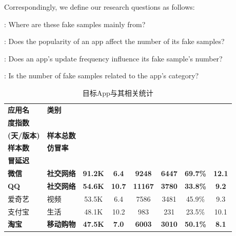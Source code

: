 Correspondingly, we define our research questions as follows:

: Where are these fake samples mainly from?

: Does the popularity of an app affect the number of its fake samples?

: Does an app's update frequency influence its fake sample's number?

: Is the number of fake samples related to the app's category?

\begin{ThreePartTable}
\centering
\renewcommand{\arraystretch}{1.05}
\footnotesize
\setlength{\belowcaptionskip}{-5pt}
\vspace{1mm}
\begin{longtable}{l l c c c c c c}
\caption{目标App与其相关统计}\label{table:data-statistics}\\
\toprule
{\bf 应用名} & {\bf 类别} & \begin{tabular}[c]{@{}c@{}}{\bf 月度热} \\ {\bf 度指数} \end{tabular} & \begin{tabular}[c]{@{}c@{}}{\bf 更新频率} \\ {\bf (天/版本)} \end{tabular} & {\bf 样本总数} & \begin{tabular}[c]{@{}c@{}}{\bf 仿冒} \\ {\bf 样本数} \end{tabular} & {\bf 仿冒率} & \begin{tabular}[c]{@{}c@{}}{\bf 平均仿} \\ {\bf 冒延迟} \end{tabular} \\
\midrule
{\bf 微信}\tnote{*} & {\bf 社交网络} & {\bf 91.2K} & {\bf 6.4} & {\bf 9248} & {\bf 6447} & {\bf 69.7\%} & {\bf 12.1} \\
\rowcolor{gray!15} {\bf QQ}\tnote{*} & {\bf 社交网络} & {\bf 54.6K} & {\bf 10.7} & {\bf 11167} & {\bf 3780} & {\bf 33.8\%} & {\bf 9.2} \\
爱奇艺 & 视频 & 53.5K & 6.4 & 7586 & 3481 & 45.9\% & 9.3 \\
\rowcolor{gray!15} 支付宝 & 生活 & 48.1K & 10.2 & 983 & 231 & 23.5\% & 10.1 \\
{\bf 淘宝}\tnote{*} & {\bf 移动购物} & {\bf 47.5K} & {\bf 7.0} & {\bf 6003} & {\bf 3010} & {\bf 50.1\%} & {\bf 8.1} \\

\end{longtable}
\end{ThreePartTable}
